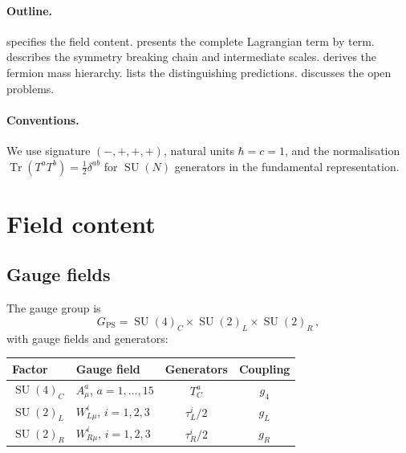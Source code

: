 \documentclass[12pt,a4paper]{article}
\theoremstyle{definition}
\newcommand{\Tr}{\operatorname{Tr}}
\newcommand{\SU}{\operatorname{SU}}
\begin{document}
\paragraph{Outline.}
 specifies the field content.
 presents the complete Lagrangian term by term.
 describes the symmetry breaking chain and intermediate scales.
 derives the fermion mass hierarchy.
 lists the distinguishing predictions.
 discusses the open problems.

\paragraph{Conventions.}
We use signature $(-,+,+,+)$, natural units $\hbar = c = 1$, and the normalisation $\Tr(T^a T^b) = \frac{1}{2}\delta^{ab}$ for $\SU(N)$ generators in the fundamental representation.


\section{Field content}
\label{sec:fields}

\subsection{Gauge fields}

The gauge group is
\begin{equation}
G_{\mathrm{PS}} = \SU(4)_C \times \SU(2)_L \times \SU(2)_R\,,
\end{equation}
with gauge fields and generators:

\begin{center}
\renewcommand{\arraystretch}{1.3}
\begin{tabular}{llcc}
\toprule
\textbf{Factor} & \textbf{Gauge field} & \textbf{Generators} & \textbf{Coupling} \\
\midrule
$\SU(4)_C$ & $A^a_\mu$, \; $a = 1, \ldots, 15$ & $T^a_C$ & $g_4$ \\
$\SU(2)_L$ & $W^i_{L\mu}$, \; $i = 1,2,3$ & $\tau^i_L/2$ & $g_L$ \\
$\SU(2)_R$ & $W^i_{R\mu}$, \; $i = 1,2,3$ & $\tau^i_R/2$ & $g_R$ \\
\bottomrule
\end{tabular}
\end{center}
\end{document}
